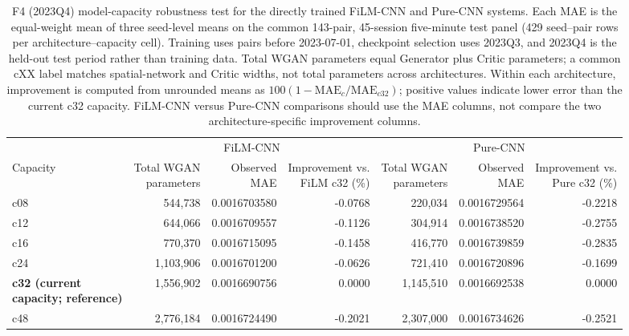 \begin{table}[htbp]
\centering
\scriptsize
\setlength{\tabcolsep}{2.5pt}
\begin{tabular}{@{}lrrr@{\hspace{8pt}}rrr@{}}
\toprule
& \multicolumn{3}{c}{FiLM-CNN} & \multicolumn{3}{c}{Pure-CNN} \\
\cmidrule(lr){2-4}\cmidrule(lr){5-7}
Capacity & \shortstack{Total WGAN\\parameters} & \shortstack{Observed\\MAE} & \shortstack{Improvement vs.\\FiLM c32 (\%)} & \shortstack{Total WGAN\\parameters} & \shortstack{Observed\\MAE} & \shortstack{Improvement vs.\\Pure c32 (\%)} \\
\midrule
c08 & 544,738 & 0.0016703580 & -0.0768 & 220,034 & 0.0016729564 & -0.2218 \\
c12 & 644,066 & 0.0016709557 & -0.1126 & 304,914 & 0.0016738520 & -0.2755 \\
c16 & 770,370 & 0.0016715095 & -0.1458 & 416,770 & 0.0016739859 & -0.2835 \\
c24 & 1,103,906 & 0.0016701200 & -0.0626 & 721,410 & 0.0016720896 & -0.1699 \\
\shortstack[l]{\textbf{c32 (current}\\\textbf{capacity; reference)}} & 1,556,902 & 0.0016690756 & 0.0000 & 1,145,510 & 0.0016692538 & 0.0000 \\
c48 & 2,776,184 & 0.0016724490 & -0.2021 & 2,307,000 & 0.0016734626 & -0.2521 \\
\bottomrule
\end{tabular}
\caption{F4 (2023Q4) model-capacity robustness test for the directly trained FiLM-CNN and Pure-CNN systems. Each MAE is the equal-weight mean of three seed-level means on the common 143-pair, 45-session five-minute test panel (429 seed--pair rows per architecture--capacity cell). Training uses pairs before 2023-07-01, checkpoint selection uses 2023Q3, and 2023Q4 is the held-out test period rather than training data. Total WGAN parameters equal Generator plus Critic parameters; a common cXX label matches spatial-network and Critic widths, not total parameters across architectures. Within each architecture, improvement is computed from unrounded means as $100(1-\mathrm{MAE}_{c}/\mathrm{MAE}_{c32})$; positive values indicate lower error than the current c32 capacity. FiLM-CNN versus Pure-CNN comparisons should use the MAE columns, not compare the two architecture-specific improvement columns.}
\label{tab:ch3:f4_film_pure_capacity_robustness}
\end{table}


